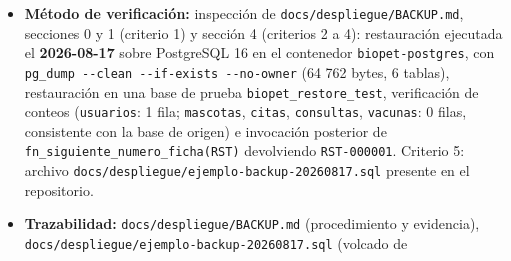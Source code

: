 \documentclass[
  spanish,
]{article}
\providecommand{\tightlist}{%
  \setlength{\itemsep}{0pt}\setlength{\parskip}{0pt}}
\begin{document}
\begin{itemize}
  \begin{enumerate}
  \def\labelenumi{\arabic{enumi}.}
  \tightlist
  \item
    El procedimiento documentado especifica: qué se respalda,
    frecuencia, formato del volcado, destino separado del host de
    producción, retención y método de verificación por suma de
    comprobación.
  \item
    Existe evidencia fechada de una restauración real: los comandos
    exactos ejecutados y el resultado obtenido, sobre un volcado
    generado con el procedimiento documentado.
  \item
    Tras la restauración, la comprobación de integridad confirma el
    número de filas esperado en las tablas del sistema.
  \item
    Tras la restauración, los procedimientos almacenados siguen siendo
    invocables: al menos una rutina se ejecuta correctamente sobre la
    base restaurada.
  \item
    Se conserva en el repositorio un volcado de ejemplo del mismo
    formato, para revisión.
  \end{enumerate}
\item
  \textbf{Método de verificación:} inspección de
  \texttt{docs/\allowbreak{}despliegue/\allowbreak{}BACKUP.\allowbreak{}md}, secciones 0 y 1 (criterio 1) y
  sección 4 (criterios 2 a 4): restauración ejecutada el
  \textbf{2026-08-17} sobre PostgreSQL 16 en el contenedor
  \texttt{biopet-\allowbreak{}postgres}, con
  \texttt{pg\_\allowbreak{}dump\ -\/-\allowbreak{}clean\ -\/-\allowbreak{}if-\allowbreak{}exists\ -\/-\allowbreak{}no-\allowbreak{}owner} (64 762
  bytes, 6 tablas), restauración en una base de prueba
  \texttt{biopet\_\allowbreak{}restore\_\allowbreak{}tes\allowbreak{}t}, verificación de conteos
  (\texttt{usuarios}: 1 fila; \texttt{mascotas}, \texttt{citas},
  \texttt{consultas}, \texttt{vacunas}: 0 filas, consistente con la base
  de origen) e invocación posterior de
  \texttt{fn\_\allowbreak{}siguiente\_\allowbreak{}numer\allowbreak{}o\_\allowbreak{}ficha(\textquotesingle{}RST\textquotesingle{})}
  devolviendo \texttt{RST-\allowbreak{}000001}. Criterio 5: archivo
  \texttt{docs/\allowbreak{}despliegue/\allowbreak{}ejemplo-\allowbreak{}backup-\allowbreak{}20260817.\allowbreak{}sql} presente en el
  repositorio.
\item
  \textbf{Trazabilidad:} \texttt{docs/\allowbreak{}despliegue/\allowbreak{}BACKUP.\allowbreak{}md}
  (procedimiento y evidencia),
  \texttt{docs/\allowbreak{}despliegue/\allowbreak{}ejemplo-\allowbreak{}backup-\allowbreak{}20260817.\allowbreak{}sql} (volcado de

\end{itemize}
\end{document}
